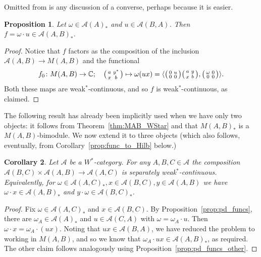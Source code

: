 \documentclass[a4paper,11pt]{article}
\theoremstyle{plain}
\newtheorem{proposition}{Proposition}[section]
\newtheorem{corollary}[proposition]{Corollary}
\theoremstyle{remark}
\newcommand{\mc}[1]{\mathcal{#1}}
\newcommand{\ip}[2]{{\langle {#1} , {#2} \rangle}}
\newenvironment{smat}{\bigl(\begin{smallmatrix}}{\end{smallmatrix}\bigr)}
\begin{document}
Omitted from \cite{GLR_Wstar_categories} is any discussion of a converse, perhaps because it is easier.

\begin{proposition}
Let $\omega\in\mc A(A)_*$ and $u\in\mc A(B,A)$.  Then $f = \omega\cdot u \in \mc A(A,B)_*$.
\end{proposition}
\begin{proof}
Notice that $f$ factors as the composition of the inclusion $\mc A(A,B) \to M(A,B)$ and the functional
\[ f_0 \colon M(A,B) \to \mathbb C; \quad
\begin{smat} a & y^* \\ x & b \end{smat} \mapsto \omega(ux)
= \ip{ \begin{smat} 0 & u \\ 0 & 0 \end{smat} \begin{smat} a & y \\ x & b \end{smat} }{ \begin{smat} \omega & 0 \\ 0 & 0 \end{smat} }. \]
Both these maps are weak$^*$-continuous, and so $f$ is weak$^*$-continuous, as claimed.
\end{proof}

The following result has already been implicitly used when we have only two objects: it follows from Theorem~\ref{thm:MAB_WStar} and that $M(A,B)_*$ is a $M(A,B)$-bimodule.  We now extend it to three objects (which also follows, eventually, from Corollary~\ref{prop:func_to_Hilb} below.)

\begin{corollary}\label{corr:sep_ws_cty}
Let $\mc A$ be a $W^*$-category.  For any $A,B,C\in\mc A$ the composition $\mc A(B,C) \times \mc A(A,B) \to \mc A(A,C)$ is separately weak$^*$-continuous.  Equivalently, for $\omega \in \mc A(A,C)_*, x\in\mc A(B,C), y\in\mc A(A,B)$ we have $\omega\cdot x \in \mc A(A,B)_*$ and $y\cdot\omega \in \mc A(B,C)_*$.
\end{corollary}
\begin{proof}
Fix $\omega\in\mc A(A,C)_*$ and $x\in\mc A(B,C)$.  By Proposition~\ref{prop:pd_funcs}, there are $\omega_A \in \mc A(A)_*$ and $u\in\mc A(C, A)$ with $\omega = \omega_A \cdot u$.  Then $\omega\cdot x = \omega_A \cdot (ux)$.  Noting that $ux \in \mc A(B,A)$, we have reduced the problem to working in $M(A,B)$, and so we know that $\omega_A \cdot ux \in \mc A(A,B)_*$, as required.  The other claim follows analogously using Proposition~\ref{prop:pd_funcs_other}.
\end{proof}
\end{document}
